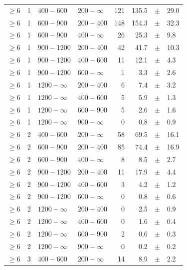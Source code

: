 \begin{table}[!h]
\begin{tabular}{rrllrrcl}
		$\geq 6$\T & 1 & $ 400- 600$ & $200-\infty$ &    121 &    135.5 
		&$\pm$&   29.0 \\
		$\geq 6$\T & 1 & $ 600- 900$ & $200-400$ &    148 &    154.3 &$\pm$&   
		32.3 \\
		$\geq 6$ & 1 & $ 600- 900$ & $400-\infty$ &     26 &     25.3 
		&$\pm$&    9.8 \\
		$\geq 6$\T & 1 & $ 900-1200$ & $200-400$ &     42 &     41.7 &$\pm$&   
		10.3 \\
		$\geq 6$ & 1 & $ 900-1200$ & $400-600$ &     11 &     12.1 &$\pm$&    
		4.3 \\
		$\geq 6$ & 1 & $ 900-1200$ & $600-\infty$ &      1 &      3.3 
		&$\pm$&    2.6 \\
		$\geq 6$\T & 1 & $1200- \infty$ & $200-400$ &      6 &      7.4 
		&$\pm$&    3.2 \\
		$\geq 6$ & 1 & $1200- \infty$ & $400-600$ &      5 &      5.9 
		&$\pm$&    1.3 \\
		$\geq 6$ & 1 & $1200- \infty$ & $600-900$ &      5 &      2.6 
		&$\pm$&    1.6 \\
		$\geq 6$ & 1 & $1200- \infty$ & $900-\infty$ &      0 &      0.8 
		&$\pm$&    0.9 \\
		$\geq 6$\T & 2 & $ 400- 600$ & $200-\infty$ &     58 &     69.5 
		&$\pm$&   16.1 \\
		$\geq 6$\T & 2 & $ 600- 900$ & $200-400$ &     85 &     74.4 &$\pm$&   
		16.9 \\
		$\geq 6$ & 2 & $ 600- 900$ & $400-\infty$ &      8 &      8.5 
		&$\pm$&    2.7 \\
		$\geq 6$\T & 2 & $ 900-1200$ & $200-400$ &     11 &     17.9 &$\pm$&    
		4.4 \\
		$\geq 6$ & 2 & $ 900-1200$ & $400-600$ &      3 &      4.2 &$\pm$&    
		1.2 \\
		$\geq 6$ & 2 & $ 900-1200$ & $600-\infty$ &      0 &      0.8 
		&$\pm$&    0.6 \\
		$\geq 6$\T & 2 & $1200- \infty$ & $200-400$ &      0 &      2.5 
		&$\pm$&    0.9 \\
		$\geq 6$ & 2 & $1200- \infty$ & $400-600$ &      0 &      1.6 
		&$\pm$&    0.4 \\
		$\geq 6$ & 2 & $1200- \infty$ & $600-900$ &      2 &      0.6 
		&$\pm$&    0.3 \\
		$\geq 6$ & 2 & $1200- \infty$ & $900-\infty$ &      0 &      0.2 
		&$\pm$&    0.2 \\
		$\geq 6$\T & 3 & $ 400- 600$ & $200-\infty$ &     14 &      8.9 
		&$\pm$&    2.2 \\

\end{tabular}
\end{table}
